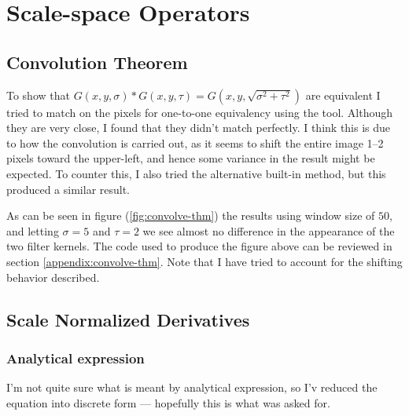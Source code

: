 %
%

\section{Scale-space Operators}

\subsection{Convolution Theorem}
To show that $G(x,y,\sigma) * G(x,y,\tau) = G(x,y,\sqrt{\sigma^2 + \tau^2})$
are equivalent I tried to match on the pixels for one-to-one equivalency using
the  tool. Although they are very close, I found that they didn't
match perfectly. I think this is due to how the convolution is carried out, as
it seems to shift the entire image 1--2 pixels toward the upper-left, and
hence some variance in the result might be expected. To counter this, I also
tried the alternative built-in  method, but this produced a
similar result. 


As can be seen in figure (\ref{fig:convolve-thm}) the results using window
size of $50$, and letting $\sigma = 5$ and $\tau = 2$ we see almost no
difference in the appearance of the two filter kernels. The code used to
produce the figure above can be reviewed in section
\ref{appendix:convolve-thm}. Note that I have tried to account for the
shifting behavior described.

\subsection{Scale Normalized Derivatives}

\subsubsection{Analytical expression}
I'm not quite sure what is meant by analytical expression, so I'v reduced the
equation into discrete form --- hopefully this is what was asked for.

